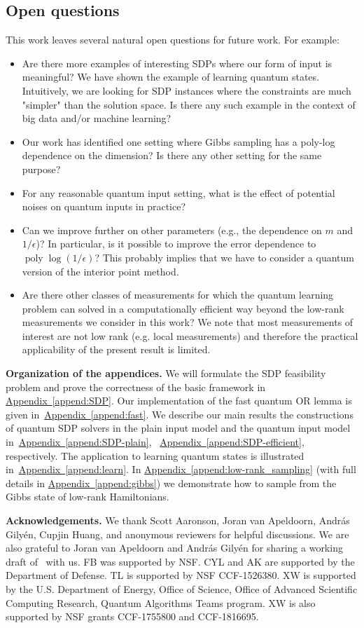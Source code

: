 \documentclass[a4paper,UKenglish,cleveref, autoref]{lipics-v2019}
\theoremstyle{remark}
\numberwithin{equation}{section}
\numberwithin{oracle}{section}
\numberwithin{remark}{section}
\newcommand{\append}[1]{\hyperref[append:#1]{Appendix~\ref*{append:#1}}}
\newcommand{\eps}{\varepsilon}
\DeclareMathOperator{\poly}{poly}
\newcommand{\hd}[1]{\vspace{2mm} \noindent \textbf{#1}}
\def \eps {\epsilon}
\begin{document}
\subsection{Open questions} This work leaves several natural open questions for future work. For example:
\begin{itemize}
\item Are there more examples of interesting SDPs where our form of input is meaningful? We have shown the example of learning quantum states. Intuitively, we are looking for SDP instances where the constraints are much "simpler" than the solution space. Is there any such example in the context of big data and/or  machine learning?
\item Our work has identified one setting where Gibbs sampling has a poly-log dependence on the dimension? Is there any other setting for the same purpose?
\item For any reasonable quantum input setting, what is the effect of potential noises on quantum inputs in practice?
\item  Can we improve further on other parameters (e.g., the dependence on $m$ and $1/\eps$)? In particular, is it possible to improve the error dependence to $\poly\log(1/\eps)$? This probably implies that we have
to consider a quantum version of the interior point method.
\item Are there other classes of measurements for which the quantum learning problem can solved in a computationally efficient way beyond the low-rank measurements we consider in this work? We note that most measurements of interest are not low rank (e.g. local measurements) and therefore the practical applicability of the present result is limited.
\end{itemize}

\hd{Organization of the appendices.}
We will formulate the SDP feasibility problem and prove the correctness of the basic framework in \append{SDP}.
Our implementation of the fast quantum OR lemma is given in~\append{fast}.
We describe our main results the constructions of quantum SDP solvers in the plain input model and the quantum input model in~\append{SDP-plain}, ~\append{SDP-efficient}, respectively.
The application to learning quantum states is illustrated in~\append{learn}.
In \append{low-rank_sampling} (with full details in \append{gibbs}) we demonstrate how to sample from the Gibbs state of low-rank Hamiltonians.

\hd{Acknowledgements.}
We thank Scott Aaronson, Joran van Apeldoorn, Andr{\'a}s Gily{\'e}n, Cupjin Huang, and anonymous reviewers for helpful discussions. We are also grateful to Joran van Apeldoorn and Andr{\'a}s Gily{\'e}n for sharing a working draft of~\cite{vAG18} with us. FB was supported by NSF. CYL and AK are supported by the Department of Defense. TL is supported by NSF CCF-1526380.  XW is supported by the U.S. Department of Energy, Office of Science, Office of Advanced Scientific Computing Research, Quantum Algorithms Teams program. XW is also supported by NSF grants CCF-1755800 and CCF-1816695.
\end{document}
